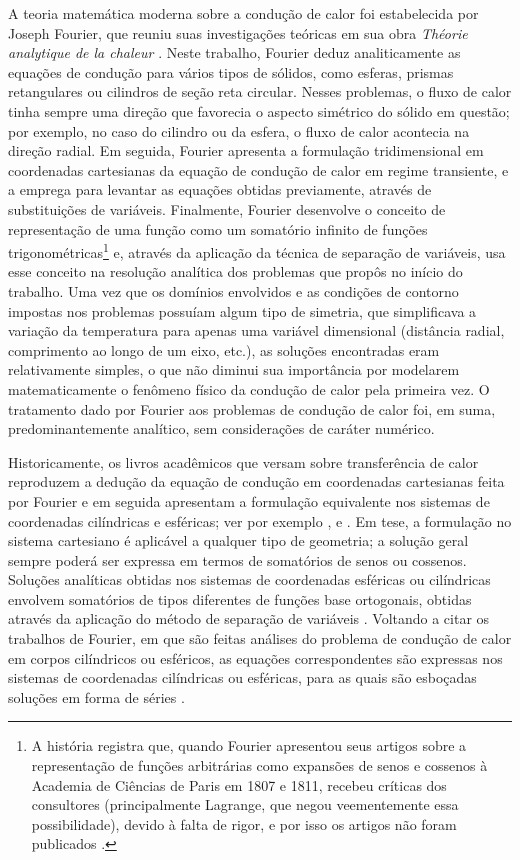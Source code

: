 A teoria matemática moderna sobre a condução de calor foi estabelecida por Joseph Fourier, que reuniu suas investigações teóricas em sua obra
\textit{Théorie analytique de la chaleur} \citep{livro_fourier, artigo_langer}. Neste trabalho, Fourier deduz analiticamente as equações de condução para vários
tipos de sólidos, como esferas, prismas retangulares ou cilindros de seção reta circular. Nesses problemas, o fluxo de calor tinha
sempre uma direção que favorecia o aspecto simétrico do sólido em questão; por exemplo, no caso do cilindro ou da esfera, o fluxo
de calor acontecia na direção radial. Em seguida, Fourier apresenta a formulação tridimensional em coordenadas cartesianas da equação
de condução de calor em regime transiente, e a emprega para levantar as equações obtidas previamente, através de substituições de
variáveis. Finalmente, Fourier desenvolve o conceito de representação de uma função como um somatório infinito de funções
trigonométricas\footnote{A história registra que, quando Fourier apresentou seus artigos sobre a representação de funções arbitrárias
como expansões de senos e cossenos à Academia de Ciências de Paris em 1807 e 1811, recebeu críticas dos consultores (principalmente Lagrange,
que negou veementemente essa possibilidade), devido à falta de rigor, e por isso os artigos não foram publicados \citep{livro_agarwal}.} e, através da aplicação
da técnica de separação de variáveis, usa esse conceito na resolução analítica dos problemas que propôs no início do trabalho. Uma vez que os domínios envolvidos e as
condições de contorno impostas nos problemas possuíam algum tipo de simetria, que simplificava a variação da temperatura para apenas uma
variável dimensional (distância radial, comprimento ao longo de um eixo, etc.), as soluções encontradas eram relativamente simples, o que não
diminui sua importância por modelarem matematicamente o fenômeno físico da condução de calor pela primeira vez. O tratamento
dado por Fourier aos problemas de condução de calor foi, em suma, predominantemente analítico, sem considerações de caráter numérico.

Historicamente, os livros acadêmicos que versam sobre transferência de calor reproduzem a dedução da equação de condução em coordenadas
cartesianas feita por Fourier e em seguida apresentam a formulação equivalente nos sistemas de coordenadas cilíndricas e esféricas; ver
por exemplo \cite{livro_carslaw}, \cite{livro_holman} e \cite{livro_ozisik}. Em tese, a formulação no sistema cartesiano é aplicável
a qualquer tipo de geometria; a solução geral sempre poderá ser expressa em termos de somatórios de senos ou cossenos. Soluções analíticas obtidas
nos sistemas de coordenadas esféricas ou cilíndricas envolvem somatórios de tipos diferentes de funções base ortogonais, obtidas através da aplicação do método
de separação de variáveis \citep{livro_boyce}. Voltando a citar os trabalhos de Fourier, em que são feitas análises do problema de condução de calor em corpos cilíndricos ou esféricos, as equações correspondentes são expressas nos sistemas de coordenadas cilíndricas ou esféricas, para as quais são esboçadas soluções em forma de séries \citep{livro_fourier}. 

